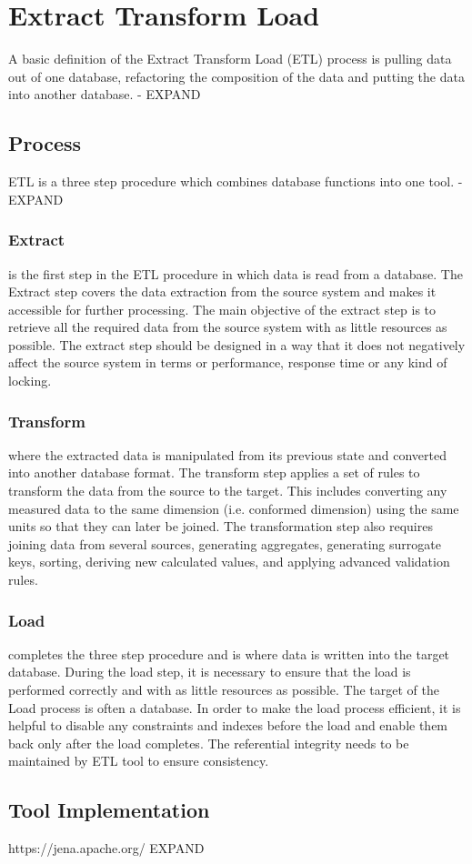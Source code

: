 \section{Extract Transform Load}\label{etl}
A basic definition of the Extract Transform Load (ETL) process is pulling data out of one database, refactoring the composition of the data and putting the data into another database. - EXPAND

\subsection{Process}
ETL is a three step procedure which combines database functions into one tool. - EXPAND
\subsubsection{Extract} is the first step in the ETL procedure in which data is read from a database. The Extract step covers the data extraction from the source system and makes it accessible for further processing. The main objective of the extract step is to retrieve all the required data from the source system with as little resources as possible. The extract step should be designed in a way that it does not negatively affect the source system in terms or performance, response time or any kind of locking.
\subsubsection{Transform} where the extracted data is manipulated from its previous state and converted into another database format. The transform step applies a set of rules to transform the data from the source to the target. This includes converting any measured data to the same dimension (i.e. conformed dimension) using the same units so that they can later be joined. The transformation step also requires joining data from several sources, generating aggregates, generating surrogate keys, sorting, deriving new calculated values, and applying advanced validation rules.
\subsubsection{Load} completes the three step procedure and is where data is written into the target database. During the load step, it is necessary to ensure that the load is performed correctly and with as little resources as possible. The target of the Load process is often a database. In order to make the load process efficient, it is helpful to disable any constraints and indexes before the load and enable them back only after the load completes. The referential integrity needs to be maintained by ETL tool to ensure consistency.
\subsection{Tool Implementation}
https://jena.apache.org/
EXPAND